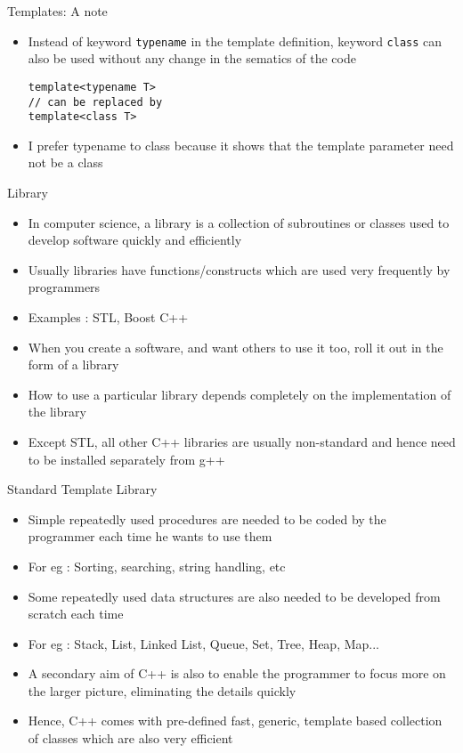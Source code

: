 \documentclass{beamer}
\begin{document}
\begin{frame}[fragile]{Templates: A note}
  \begin{itemize}
  \item Instead of keyword \texttt{typename} in the template definition, keyword \texttt{class} can also be used without any change in the sematics of the code\pause
    \begin{lstlisting}
template<typename T> 
// can be replaced by 
template<class T>
    \end{lstlisting}\pause
  \item I prefer typename to class because it shows that the template parameter need not be a class
  \end{itemize}
\end{frame}

\begin{frame}[fragile]{Library}
  \begin{itemize}
    \item In computer science, a library is a collection of subroutines or classes used to develop software quickly and efficiently\pause
    \item Usually libraries have functions/constructs which are used very frequently by programmers\pause
    \item Examples : STL, Boost C++\pause
    \item When you create a software, and want others to use it too, roll it out in the form of a library\pause
    \item How to use a particular library depends completely on the implementation of the library\pause
    \item Except STL, all other C++ libraries are usually non-standard and hence need to be installed separately from g++
  \end{itemize}
\end{frame}

\begin{frame}[fragile]{Standard Template Library}
  \begin{itemize}
    \item Simple repeatedly used procedures are needed to be coded by the programmer each time he wants to use them\pause
    \item For eg : Sorting, searching, string handling, etc\pause
    \item Some repeatedly used data structures are also needed to be developed from scratch each time\pause
    \item For eg : Stack, List, Linked List, Queue, Set, Tree, Heap, Map...\pause
    \item A secondary aim of C++ is also to enable the programmer to focus more on the larger picture, eliminating the details quickly\pause
    \item Hence, C++ comes with pre-defined fast, generic, template based collection of classes which are also very efficient
  \end{itemize}
\end{frame}
\end{document}

